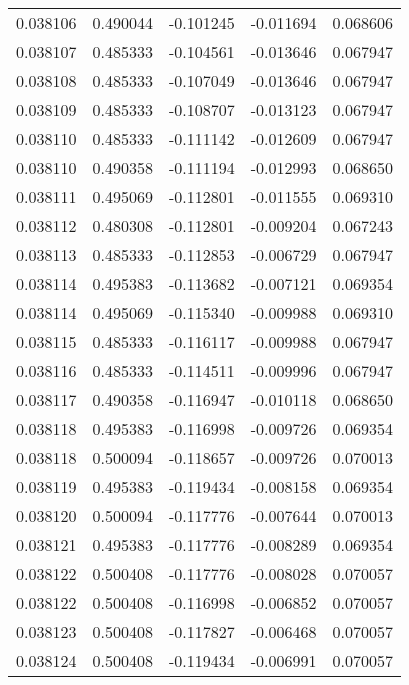 \begin{tabular}{lrrrr}
0.038106    &  0.490044 & -0.101245 & -0.011694 &             0.068606 \\
0.038107    &  0.485333 & -0.104561 & -0.013646 &             0.067947 \\
0.038108    &  0.485333 & -0.107049 & -0.013646 &             0.067947 \\
0.038109    &  0.485333 & -0.108707 & -0.013123 &             0.067947 \\
0.038110    &  0.485333 & -0.111142 & -0.012609 &             0.067947 \\
0.038110    &  0.490358 & -0.111194 & -0.012993 &             0.068650 \\
0.038111    &  0.495069 & -0.112801 & -0.011555 &             0.069310 \\
0.038112    &  0.480308 & -0.112801 & -0.009204 &             0.067243 \\
0.038113    &  0.485333 & -0.112853 & -0.006729 &             0.067947 \\
0.038114    &  0.495383 & -0.113682 & -0.007121 &             0.069354 \\
0.038114    &  0.495069 & -0.115340 & -0.009988 &             0.069310 \\
0.038115    &  0.485333 & -0.116117 & -0.009988 &             0.067947 \\
0.038116    &  0.485333 & -0.114511 & -0.009996 &             0.067947 \\
0.038117    &  0.490358 & -0.116947 & -0.010118 &             0.068650 \\
0.038118    &  0.495383 & -0.116998 & -0.009726 &             0.069354 \\
0.038118    &  0.500094 & -0.118657 & -0.009726 &             0.070013 \\
0.038119    &  0.495383 & -0.119434 & -0.008158 &             0.069354 \\
0.038120    &  0.500094 & -0.117776 & -0.007644 &             0.070013 \\
0.038121    &  0.495383 & -0.117776 & -0.008289 &             0.069354 \\
0.038122    &  0.500408 & -0.117776 & -0.008028 &             0.070057 \\
0.038122    &  0.500408 & -0.116998 & -0.006852 &             0.070057 \\
0.038123    &  0.500408 & -0.117827 & -0.006468 &             0.070057 \\
0.038124    &  0.500408 & -0.119434 & -0.006991 &             0.070057 \\

\end{tabular}
